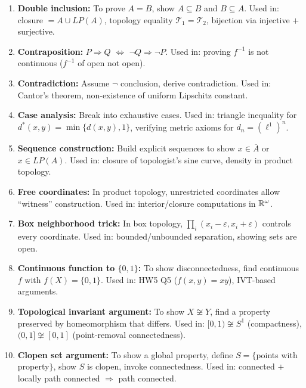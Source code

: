 \documentclass{article}
\begin{document}
\begin{enumerate}
  \item \textbf{Double inclusion:} To prove $A = B$, show $A
    \subseteq B$ and $B \subseteq A$.
    Used in: closure $= A \cup LP(A)$, topology equality
    $\mathcal{T}_1 = \mathcal{T}_2$, bijection via injective $+$ surjective.

  \item \textbf{Contraposition:} $P \Rightarrow Q$ $\iff$ $\neg Q
    \Rightarrow \neg P$.
    Used in: proving $f^{-1}$ is not continuous ($f^{-1}$ of open not open).

  \item \textbf{Contradiction:} Assume $\neg$ conclusion, derive contradiction.
    Used in: Cantor's theorem, non-existence of uniform Lipschitz constant.

  \item \textbf{Case analysis:} Break into exhaustive cases.
    Used in: triangle inequality for $d^*(x,y) = \min\{d(x,y),1\}$,
    verifying metric axioms for $d_n = (\ell^1)^n$.

  \item \textbf{Sequence construction:} Build explicit sequences to
    show $x \in \overline{A}$ or $x \in LP(A)$.
    Used in: closure of topologist's sine curve, density in product topology.

  \item \textbf{Free coordinates:} In product topology, unrestricted
    coordinates allow ``witness'' construction.
    Used in: interior/closure computations in $\mathbb{R}^\omega$.

  \item \textbf{Box neighborhood trick:} In box topology, $\prod_i
    (x_i - \varepsilon, x_i + \varepsilon)$ controls every coordinate.
    Used in: bounded/unbounded separation, showing sets are open.

  \item \textbf{Continuous function to $\{0,1\}$:} To show
    disconnectedness, find continuous $f$ with $f(X) = \{0, 1\}$.
    Used in: HW5 Q5 ($f(x,y)=xy$), IVT-based arguments.

  \item \textbf{Topological invariant argument:} To show $X \not\cong
    Y$, find a property preserved by homeomorphism that differs.
    Used in: $[0,1) \not\cong S^1$ (compactness), $(0,1] \not\cong
    [0,1]$ (point-removal connectedness).

  \item \textbf{Clopen set argument:} To show a global property,
    define $S = \{$points with property$\}$, show $S$ is clopen,
    invoke connectedness.
    Used in: connected $+$ locally path connected $\Rightarrow$ path connected.


\end{enumerate}
\end{document}
